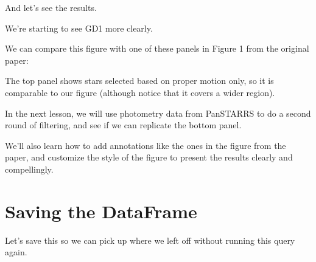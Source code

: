 \documentclass[letterpaper,10pt,english]{sphinxmanual}
\begin{document}
And let’s see the results.

\begin{sphinxVerbatim}[commandchars=\\\{\}]
  \PYG{p}{[}\PYG{p}{]}
  \PYG{p}{[}\PYG{p}{]}

    

\end{sphinxVerbatim}

\noindent{}

We’re starting to see GD\sphinxhyphen{}1 more clearly.

We can compare this figure with one of these panels in Figure 1 from the original paper:





The top panel shows stars selected based on proper motion only, so it is comparable to our figure (although notice that it covers a wider region).

In the next lesson, we will use photometry data from Pan\sphinxhyphen{}STARRS to do a second round of filtering, and see if we can replicate the bottom panel.

We’ll also learn how to add annotations like the ones in the figure from the paper, and customize the style of the figure to present the results clearly and compellingly.


\section{Saving the DataFrame}
\label{\detokenize{04_select:saving-the-dataframe}}
Let’s save this  so we can pick up where we left off without running this query again.
\end{document}
